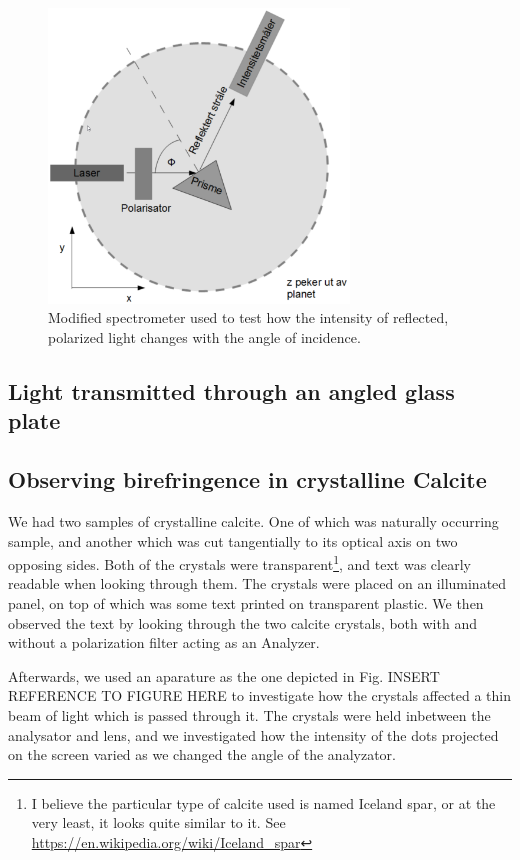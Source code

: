 \documentclass[11pt,a4paper,twocolumn]{article}
\begin{document}
    \begin{figure}[H]
      \center
      \includegraphics[width=8cm]{scripts/figs/modified_spectrometer.png}
      \caption{Modified spectrometer used to test how the intensity of reflected, polarized light changes with the angle of incidence.}
      \label{fig:mod_spectro}
    \end{figure}

  \subsection{Light transmitted through an angled glass plate}


  \subsection{Observing birefringence in crystalline Calcite}
    We had two samples of crystalline calcite. One of which was naturally occurring sample, and another which was cut tangentially to its optical axis on two opposing sides. Both of the crystals were transparent\footnote{I believe the particular type of calcite used is named Iceland spar, or at the very least, it looks quite similar to it. See \url{https://en.wikipedia.org/wiki/Iceland_spar}}, and text was clearly readable when looking through them. The crystals were placed on an illuminated panel, on top of which was some text printed on transparent plastic. We then observed the text by looking through the two calcite crystals, both with and without a polarization filter acting as an Analyzer. 

    Afterwards, we used an aparature as the one depicted in Fig. INSERT REFERENCE TO FIGURE HERE to investigate how the crystals affected a thin beam of light which is passed through it. The crystals were held inbetween the analysator and lens, and we investigated how the intensity of the dots projected on the screen varied as we changed the angle of the analyzator.
\end{document}
